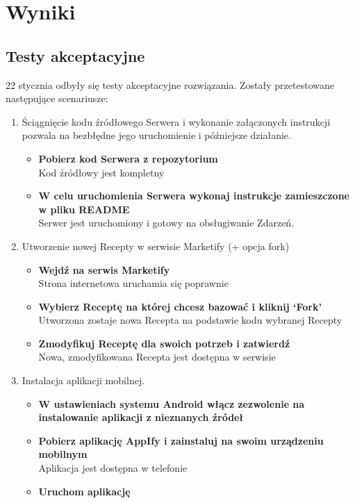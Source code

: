\documentclass[11pt,a4paper,polish,thesis]{dcsbook}
\begin{document}
\chapter{Wyniki}
\section{Testy akceptacyjne}
22 stycznia odbyły się testy akceptacyjne rozwiązania. Zostały przetestowane następujące scenariusze:
\begin{enumerate}
\item
Ściągnięcie kodu źródłowego Serwera i wykonanie załączonych instrukcji pozwala na bezbłędne jego uruchomienie i późniejsze działanie.
\begin{itemize}
\item \textbf{Pobierz kod Serwera z repozytorium}\\
Kod źródłowy jest kompletny
\item \textbf{W celu uruchomienia Serwera wykonaj instrukcje zamieszczone w pliku README}\\
Serwer jest uruchomiony i gotowy na obsługiwanie Zdarzeń.
\end{itemize}
\item
Utworzenie nowej Recepty w serwisie Marketify (+ opcja fork)
\begin{itemize}
\item \textbf{Wejdź na serwis Marketify}\\
Strona internetowa uruchamia się poprawnie
\item \textbf{Wybierz Receptę na której chcesz bazować i kliknij ‘Fork’}\\
Utworzona zostaje nowa Recepta na podstawie kodu wybranej Recepty
\item \textbf{Zmodyfikuj Receptę dla swoich potrzeb i zatwierdź}\\
Nowa, zmodyfikowana Recepta jest dostępna w serwisie
\end{itemize}
\item
Instalacja aplikacji mobilnej.
\begin{itemize}
\item \textbf{W ustawieniach systemu Android włącz zezwolenie na instalowanie aplikacji z nieznanych źródeł}\\
\item \textbf{Pobierz aplikację AppIfy i zainstaluj na swoim urządzeniu mobilnym}\\
Aplikacja jest dostępna w telefonie
\item \textbf{Uruchom aplikację}\\

\end{itemize}
\end{enumerate}
\end{document}
